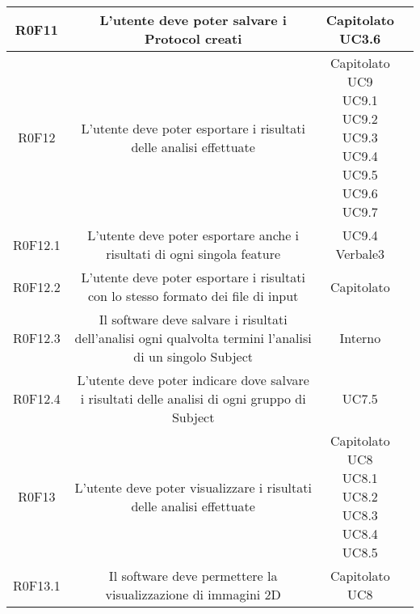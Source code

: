 \begin{center}
\begin{longtable}{|c|c|c|c|}
\hline
R0F11   & \parbox[t]{\larghezza}{L'utente deve poter salvare i Protocol\glossario{} creati}  & \parbox[t]{\dimFonti}{ Capitolato \\ UC3.6 \\} \\
\hline
R0F12   & \parbox[t]{\larghezza}{L'utente deve poter esportare i risultati delle analisi effettuate}  & \parbox[t]{\dimFonti}{ Capitolato \\ UC9 \\ UC9.1 \\ UC9.2 \\ UC9.3 \\ UC9.4 \\ UC9.5 \\ UC9.6 \\ UC9.7 \\} \\
\hline
R0F12.1   & \parbox[t]{\larghezza}{L'utente deve poter esportare anche i risultati di ogni singola feature\glossario{}}  & \parbox[t]{\dimFonti}{ UC9.4 \\ Verbale3 \\} \\
\hline
R0F12.2   & \parbox[t]{\larghezza}{L'utente deve poter esportare i risultati con lo stesso formato dei file di input}  & \parbox[t]{\dimFonti}{ Capitolato \\} \\
\hline
R0F12.3   & \parbox[t]{\larghezza}{Il software deve salvare i risultati dell'analisi ogni qualvolta termini l'analisi di un singolo Subject\glossario{}}  & \parbox[t]{\dimFonti}{ Interno \\} \\
\hline
R0F12.4   & \parbox[t]{\larghezza}{L'utente deve poter indicare dove salvare i risultati delle analisi di ogni gruppo di Subject\glossario{}}  & \parbox[t]{\dimFonti}{ UC7.5 \\} \\
\hline
R0F13   & \parbox[t]{\larghezza}{L'utente deve poter visualizzare i risultati delle analisi effettuate}  & \parbox[t]{\dimFonti}{ Capitolato \\ UC8 \\ UC8.1 \\ UC8.2 \\ UC8.3 \\ UC8.4 \\ UC8.5 \\} \\
\hline
R0F13.1   & \parbox[t]{\larghezza}{Il software deve permettere la visualizzazione di immagini 2D}  & \parbox[t]{\dimFonti}{ Capitolato \\ UC8 \\} \\

\end{longtable}
\end{center}
